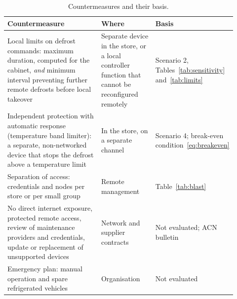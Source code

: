\documentclass{ceurart}
\begin{document}
\begin{table}[ht]
  \caption{Countermeasures and their basis.}
  \label{tab:countermeasures}
  \begin{tabular}{@{}p{0.42\linewidth}p{0.24\linewidth}p{0.26\linewidth}@{}}
    \toprule
    Countermeasure & Where & Basis \\
    \midrule
    Local limits on defrost commands: maximum duration, computed for the cabinet, \emph{and} minimum interval preventing further remote defrosts before local takeover & Separate device in the store, or a local controller function that cannot be reconfigured remotely & Scenario 2, Tables~\ref{tab:sensitivity} and~\ref{tab:limits} \\
    Independent protection with automatic response (temperature band limiter): a separate, non-networked device that stops the defrost above a temperature limit & In the store, on a separate channel & Scenario 4; break-even condition~\eqref{eq:breakeven} \\
    Separation of access: credentials and nodes per store or per small group & Remote management & Table~\ref{tab:blast} \\
    No direct internet exposure, protected remote access, review of maintenance providers and credentials, update or replacement of unsupported devices & Network and supplier contracts & Not evaluated; ACN bulletin~\cite{cyber360acn2026} \\
    Emergency plan: manual operation and spare refrigerated vehicles & Organisation & Not evaluated \\
    \bottomrule
  \end{tabular}
\end{table}
\end{document}
